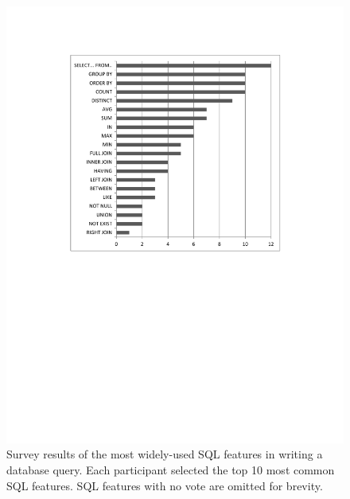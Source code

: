 
\begin{figure}[t]
  \centering
  \includegraphics[scale=0.55]{survey}
  \vspace*{-3.0ex}\caption {{\label{fig:survey}
  Survey results of the most widely-used SQL features
  in writing a database query. Each participant
  selected the top 10 most common SQL features.
  SQL features with no vote are omitted 
  for brevity.
}}
\vspace{-1mm}
\end{figure}

\newcommand{\q}{\langle query\rangle}
\newcommand{\db}{\langle db\rangle}
\newcommand{\pat}{\langle pat\rangle}
\newcommand{\bug}{\langle bug\rangle}
\newcommand{\dist}{\langle distance\rangle}
\newcommand{\sem}[1]{\llbracket #1\rrbracket}
\newcommand{\lit}[1]{\texttt{#1}}

\newcommand{\column}{\langle column\rangle}
\newcommand{\dbtable}{\langle table\rangle}
\newcommand{\cond}{\langle cond\rangle}
\newcommand{\op}{\langle op\rangle}
\newcommand{\e}{\langle expr\rangle}
\newcommand{\ce}{\langle cexpr\rangle}

